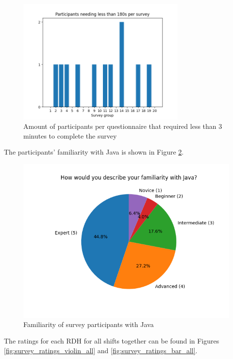 \documentclass[%
class=scrreprt,
chapterprefix=false,%
open=right,%
twoside=false,%
paper=a4,%
logofile={Logo\_zentral\_farbig\_EN.png},%
thesistype=master,%
UKenglish,%
]{se2thesis}
\theoremstyle{definition}
\begin{document}
	\begin{figure}[t]
		\centering
		\includegraphics[width=0.75\textwidth]{img/survey_time_less_than_180.png}
		\caption{Amount of participants per questionnaire that required less than 3 minutes to complete the survey}
		\label{fig:survey_time_less_than_180}
	\end{figure}
	
	The participants' familiarity with Java is shown in Figure \ref{fig:survey_java_familiarity_pie}.
	
	\begin{figure}[t]
		\centering
		\includegraphics[width=\textwidth]{img/survey_java_familiarity_pie.png}
		\caption{Familiarity of survey participants with Java}
		\label{fig:survey_java_familiarity_pie}
	\end{figure}
	
	The ratings for each RDH for all shifts together can be found in Figures \ref{fig:survey_ratings_violin_all} and \ref{fig:survey_ratings_bar_all}.
	
\end{document}
